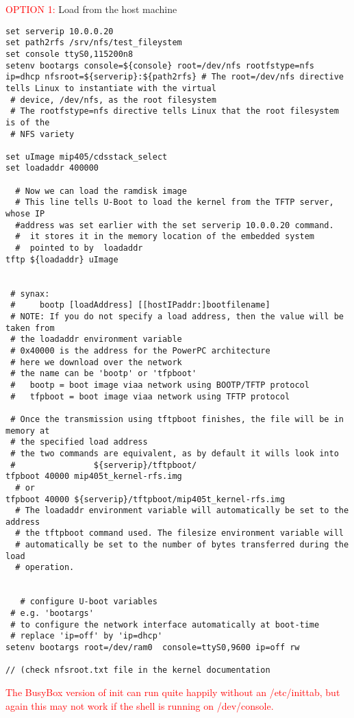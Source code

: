 \textcolor{red}{OPTION 1:} Load from the host machine
\begin{verbatim}
set serverip 10.0.0.20
set path2rfs /srv/nfs/test_fileystem
set console ttyS0,115200n8
setenv bootargs console=${console} root=/dev/nfs rootfstype=nfs
ip=dhcp nfsroot=${serverip}:${path2rfs} # The root=/dev/nfs directive tells Linux to instantiate with the virtual
 # device, /dev/nfs, as the root filesystem
 # The rootfstype=nfs directive tells Linux that the root filesystem is of the
 # NFS variety

set uImage mip405/cdsstack_select
set loadaddr 400000
 
  # Now we can load the ramdisk image
  # This line tells U-Boot to load the kernel from the TFTP server, whose IP
  #address was set earlier with the set serverip 10.0.0.20 command.
  #  it stores it in the memory location of the embedded system 
  #  pointed to by  loadaddr 
tftp ${loadaddr} uImage


 # synax:
 #     bootp [loadAddress] [[hostIPaddr:]bootfilename]
 # NOTE: If you do not specify a load address, then the value will be taken from
 # the loadaddr environment variable
 # 0x40000 is the address for the PowerPC architecture
 # here we download over the network
 # the name can be 'bootp' or 'tfpboot'
 #   bootp = boot image viaa network using BOOTP/TFTP protocol
 #   tfpboot = boot image viaa network using TFTP protocol
 
 # Once the transmission using tftpboot finishes, the file will be in memory at
 # the specified load address
 # the two commands are equivalent, as by default it wills look into
 #                ${serverip}/tftpboot/
tfpboot 40000 mip405t_kernel-rfs.img
  # or
tfpboot 40000 ${serverip}/tftpboot/mip405t_kernel-rfs.img
  # The loadaddr environment variable will automatically be set to the address
  # the tftpboot command used. The filesize environment variable will
  # automatically be set to the number of bytes transferred during the load
  # operation.
  
  
   # configure U-boot variables
 # e.g. 'bootargs'
 # to configure the network interface automatically at boot-time
 # replace 'ip=off' by 'ip=dhcp'
setenv bootargs root=/dev/ram0  console=ttyS0,9600 ip=off rw

// (check nfsroot.txt file in the kernel documentation

\end{verbatim}

\textcolor{red}{The BusyBox version of init can run quite happily without an
/etc/inittab, but again this may not work if the shell is running on
/dev/console.}



